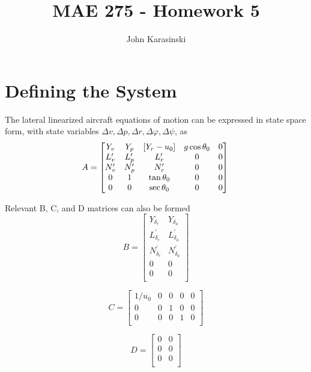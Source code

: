 \documentclass[12pt]{article}
\title{MAE 275 - Homework 5}
\author{John Karasinski}
\begin{document}
\maketitle

\section{Defining the System}
The lateral linearized aircraft equations of motion can be expressed in state space form, with state variables $\Delta v, \Delta p, \Delta r, \Delta \varphi, \Delta \psi $, as
\begin{equation*}
A =
\begin{bmatrix}
    Y_v & Y_p & \left[ Y_r-u_0 \right] & g\cos \theta_0 & 0 \\
    L_v^\prime & L_p^\prime & L_r^\prime & 0 & 0 \\
    N_v^\prime & N_p^\prime & N_r^\prime & 0 & 0 \\
    0 & 1 & \tan \theta_0 & 0 & 0 \\
    0 & 0 & \sec \theta_0 & 0 & 0
\end{bmatrix}\\
\end{equation*}

\noindent Relevant B, C, and D matrices can also be formed
\begin{equation*}
B =
\begin{bmatrix}
     Y_{\delta_r}       & Y_{\delta_a} \\ 
     L_{\delta_r}^\prime & L_{\delta_a}^\prime \\
     N_{\delta_r}^\prime & N_{\delta_a}^\prime \\
     0           & 0 \\
     0           & 0 \\
\end{bmatrix}
\end{equation*}

\begin{equation*}
C =
\begin{bmatrix}
    1/u_0 & 0 & 0 & 0 & 0\\
    0     & 0 & 1 & 0 & 0\\
    0     & 0 & 0 & 1 & 0\\
\end{bmatrix}
\end{equation*}

\begin{equation*}
D =
\begin{bmatrix}
     0 & 0 \\
     0 & 0 \\
     0 & 0 \\
\end{bmatrix}
\end{equation*}
\end{document}
